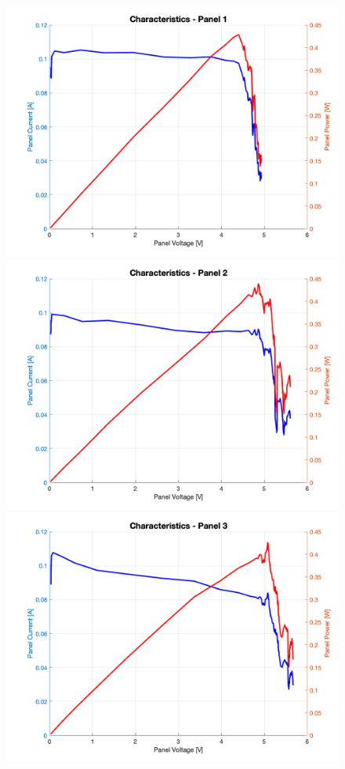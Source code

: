 \documentclass[a4paper]{article}
\begin{document}
 \begin{figure}[H]
    \centering
    \includegraphics[scale=0.18]{Panel1.png}
    \includegraphics[scale=0.18]{Panel2.png}
    \includegraphics[scale=0.18]{Panel3.png}

\end{figure}
\end{document}
